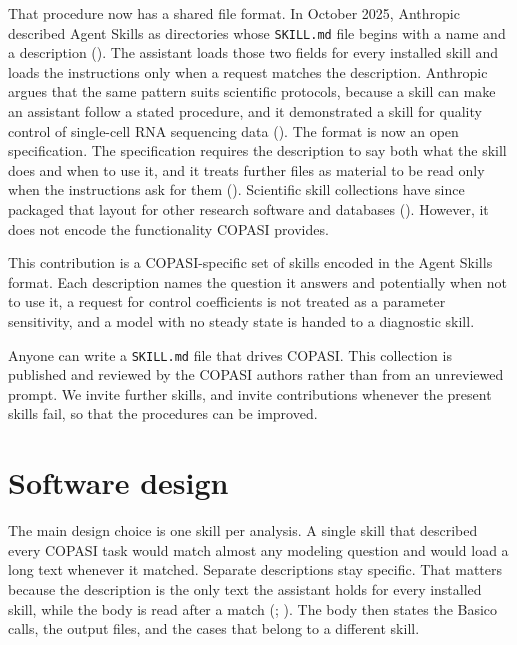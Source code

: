 \documentclass[10pt,a4paper,onecolumn]{article}
\begin{document}
  That procedure now has a shared file format. In October 2025, Anthropic
  described Agent Skills as directories whose \texttt{SKILL.md} file
  begins with a name and a description
  (). The assistant
  loads those two fields for every installed skill and loads the
  instructions only when a request matches the description. Anthropic
  argues that the same pattern suits scientific protocols, because a skill
  can make an assistant follow a stated procedure, and it demonstrated a
  skill for quality control of single-cell RNA sequencing data
  (). The format
  is now an open specification. The specification requires the description
  to say both what the skill does and when to use it, and it treats
  further files as material to be read only when the instructions ask for
  them (). Scientific
  skill collections have since packaged that layout for other research
  software and databases ().
  However, it does not encode the functionality COPASI provides.

  This contribution is a COPASI-specific set of skills encoded in the
  Agent Skills format. Each description names the question it answers and
  potentially when not to use it, a request for control coefficients is
  not treated as a parameter sensitivity, and a model with no steady state
  is handed to a diagnostic skill.

  Anyone can write a \texttt{SKILL.md} file that drives COPASI. This
  collection is published and reviewed by the COPASI authors rather than
  from an unreviewed prompt. We invite further skills, and invite
  contributions whenever the present skills fail, so that the procedures
  can be improved.

  \section{Software design}\label{software-design}

  The main design choice is one skill per analysis. A single skill that
  described every COPASI task would match almost any modeling question and
  would load a long text whenever it matched. Separate descriptions stay
  specific. That matters because the description is the only text the
  assistant holds for every installed skill, while the body is read after
  a match (;
  ). The body then
  states the Basico calls, the output files, and the cases that belong to
  a different skill.
\end{document}
